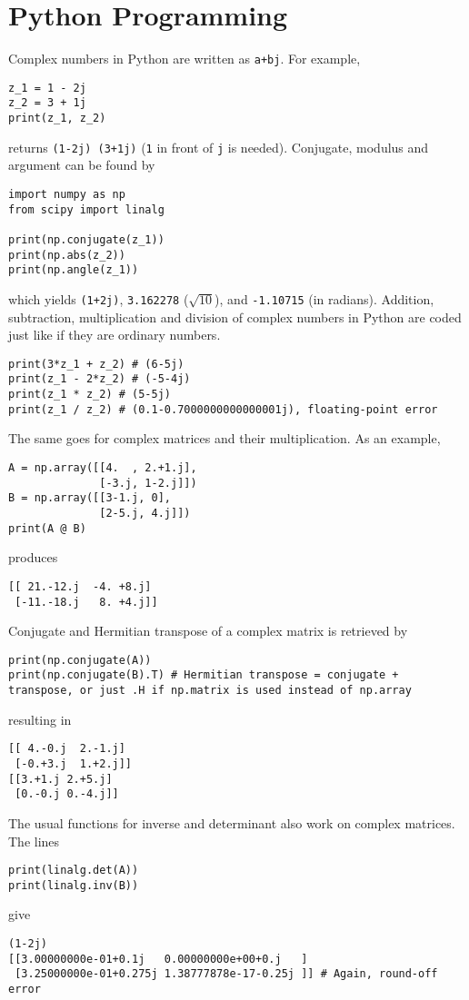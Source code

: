 \section{Python Programming}
Complex numbers in Python are written as \verb|a+bj|. For example,
\begin{lstlisting}
z_1 = 1 - 2j
z_2 = 3 + 1j
print(z_1, z_2)
\end{lstlisting}
returns \verb|(1-2j) (3+1j)| (\texttt{1} in front of \texttt{j} is needed). Conjugate, modulus and argument can be found by
\begin{lstlisting}
import numpy as np
from scipy import linalg

print(np.conjugate(z_1))
print(np.abs(z_2))    
print(np.angle(z_1))
\end{lstlisting}
which yields \verb|(1+2j)|, \verb|3.162278| ($\sqrt{10}$), and \verb|-1.10715| (in radians). Addition, subtraction, multiplication and division of complex numbers in Python are coded just like if they are ordinary numbers.
\begin{lstlisting}
print(3*z_1 + z_2) # (6-5j)
print(z_1 - 2*z_2) # (-5-4j)
print(z_1 * z_2) # (5-5j)
print(z_1 / z_2) # (0.1-0.7000000000000001j), floating-point error
\end{lstlisting}
The same goes for complex matrices and their multiplication. As an example,
\begin{lstlisting}
A = np.array([[4.  , 2.+1.j],
              [-3.j, 1-2.j]])
B = np.array([[3-1.j, 0],
              [2-5.j, 4.j]])
print(A @ B)
\end{lstlisting}
produces
\begin{lstlisting}
[[ 21.-12.j  -4. +8.j]
 [-11.-18.j   8. +4.j]]    
\end{lstlisting}
Conjugate and Hermitian transpose of a complex matrix is retrieved by
\begin{lstlisting}
print(np.conjugate(A))
print(np.conjugate(B).T) # Hermitian transpose = conjugate + transpose, or just .H if np.matrix is used instead of np.array
\end{lstlisting}
resulting in
\begin{lstlisting}
[[ 4.-0.j  2.-1.j]
 [-0.+3.j  1.+2.j]]
[[3.+1.j 2.+5.j]
 [0.-0.j 0.-4.j]]
\end{lstlisting}
The usual functions for inverse and determinant also work on complex matrices. The lines
\begin{lstlisting}
print(linalg.det(A))
print(linalg.inv(B))
\end{lstlisting}
give
\begin{lstlisting}
(1-2j)
[[3.00000000e-01+0.1j   0.00000000e+00+0.j   ]
 [3.25000000e-01+0.275j 1.38777878e-17-0.25j ]] # Again, round-off error    
\end{lstlisting}
